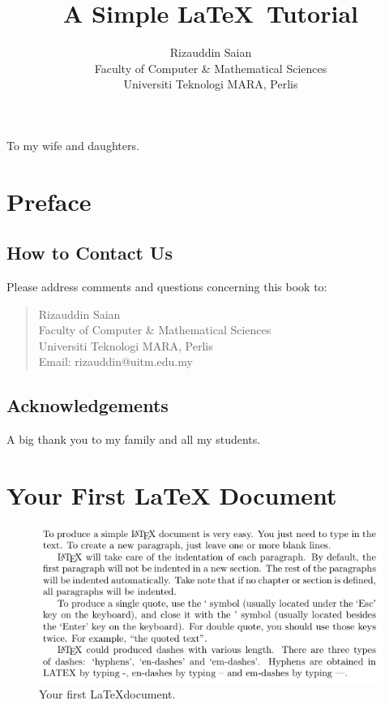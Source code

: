 \documentclass[a4paper,twoside]{book}
\title{A Simple \LaTeX\ Tutorial}
\author{Rizauddin Saian \\ 
    Faculty of Computer \& Mathematical Sciences \\
    Universiti Teknologi MARA, Perlis}
\newenvironment{dedication}
{
    \cleardoublepage
    \thispagestyle{empty}
    \vspace*{\stretch{1}}
    \hfill\begin{minipage}[t]{0.66\textwidth}
        \raggedright
    }%
    {
    \end{minipage}
    \vspace*{\stretch{3}}
    \clearpage
}
\begin{document}
    
\maketitle


\frontmatter

\begin{dedication}
    To my wife and daughters.
\end{dedication}


\tableofcontents
\chapter{Preface}


\section*{How to Contact Us}
Please address comments and questions concerning this book to:\\
\begin{quote}
Rizauddin Saian\\
Faculty of Computer \& Mathematical Sciences \\
Universiti Teknologi MARA, Perlis\\
Email: rizauddin@uitm.edu.my
\end{quote}

\section*{Acknowledgements}
A big thank you to my family and all my students.

\listoffigures

\mainmatter 


\chapter{Your First \LaTeX{} Document}
\label{chap:firstLaTeX}

\begin{figure}[h]
    \centering
    \includegraphics[width=0.7\linewidth]{img/tut1}
    \caption{Your first \LaTeX document.}
    \label{fig:tut1}
\end{figure}
\end{document}
